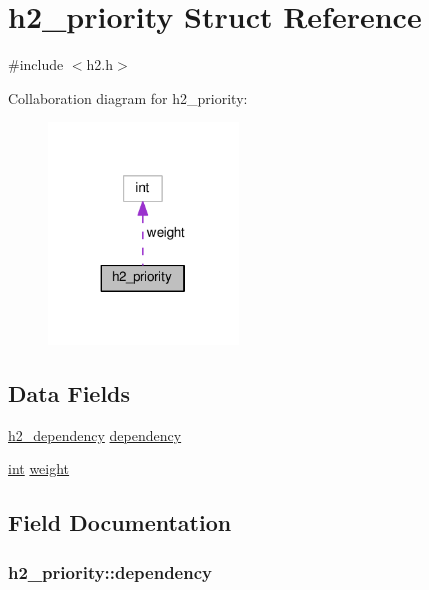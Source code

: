 \hypertarget{structh2__priority}{}\section{h2\+\_\+priority Struct Reference}
\label{structh2__priority}


{\ttfamily \#include $<$h2.\+h$>$}



Collaboration diagram for h2\+\_\+priority\+:
\nopagebreak
\begin{figure}[H]
\begin{center}
\leavevmode
\includegraphics[width=143pt]{structh2__priority__coll__graph}
\end{center}
\end{figure}
\subsection*{Data Fields}
\begin{DoxyCompactItemize}
\item 
\hyperlink{h2_8h_a3b85fbe95e6fa95a738d8d8f2706c771}{h2\+\_\+dependency} \hyperlink{structh2__priority_ad0a95afad7af7a2dc4ffec78fc819f40}{dependency}
\item 
\hyperlink{pcre_8txt_a42dfa4ff673c82d8efe7144098fbc198}{int} \hyperlink{structh2__priority_a3501a5e9d3cff58e1b18760fa100b1c3}{weight}
\end{DoxyCompactItemize}


\subsection{Field Documentation}
\subsubsection[{\texorpdfstring{dependency}{dependency}}]{ h2\+\_\+priority\+::dependency}\hypertarget{structh2__priority_ad0a95afad7af7a2dc4ffec78fc819f40}{}\label{structh2__priority_ad0a95afad7af7a2dc4ffec78fc819f40}
